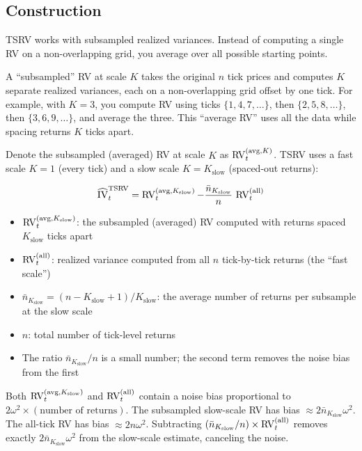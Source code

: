\subsection{Construction}

TSRV works with subsampled realized variances.
Instead of computing a single RV on a non-overlapping grid, you average over all possible starting points.

\begin{prereq}[Subsampling]
A ``subsampled'' RV at scale $K$ takes the original $n$ tick prices and computes $K$ separate realized variances, each on a non-overlapping grid offset by one tick.
For example, with $K = 3$, you compute RV using ticks $\{1, 4, 7, \ldots\}$, then $\{2, 5, 8, \ldots\}$, then $\{3, 6, 9, \ldots\}$, and average the three.
This ``average RV'' uses all the data while spacing returns $K$ ticks apart.
\end{prereq}

Denote the subsampled (averaged) RV at scale $K$ as $\operatorname{RV}^{(\text{avg}, K)}_t$.
TSRV uses a fast scale $K = 1$ (every tick) and a slow scale $K = K_{\text{slow}}$ (spaced-out returns):

\begin{definition}
\begin{equation}
  \widehat{\operatorname{IV}}_t^{\text{TSRV}} = \operatorname{RV}^{(\text{avg}, K_{\text{slow}})}_t - \frac{\bar{n}_{K_\text{slow}}}{n}\, \operatorname{RV}^{(\text{all})}_t
  \label{eq:tsrv}
\end{equation}
\begin{itemize}[nosep]
  \item $\operatorname{RV}^{(\text{avg}, K_{\text{slow}})}_t$: the subsampled (averaged) RV computed with returns spaced $K_{\text{slow}}$ ticks apart
  \item $\operatorname{RV}^{(\text{all})}_t$: realized variance computed from all $n$ tick-by-tick returns (the ``fast scale'')
  \item $\bar{n}_{K_\text{slow}} = (n - K_{\text{slow}} + 1)/K_{\text{slow}}$: the average number of returns per subsample at the slow scale
  \item $n$: total number of tick-level returns
  \item The ratio $\bar{n}_{K_\text{slow}} / n$ is a small number; the second term removes the noise bias from the first
\end{itemize}
\end{definition}

\begin{intuition}
Both $\operatorname{RV}^{(\text{avg}, K_{\text{slow}})}_t$ and $\operatorname{RV}^{(\text{all})}_t$ contain a noise bias proportional to $2 \omega^2 \times (\text{number of returns})$.
The subsampled slow-scale RV has bias $\approx 2\bar{n}_{K_\text{slow}}\omega^2$.
The all-tick RV has bias $\approx 2n\omega^2$.
Subtracting $(\bar{n}_{K_\text{slow}} / n) \times \operatorname{RV}^{(\text{all})}_t$ removes exactly $2\bar{n}_{K_\text{slow}}\omega^2$ from the slow-scale estimate, canceling the noise.
\end{intuition}

